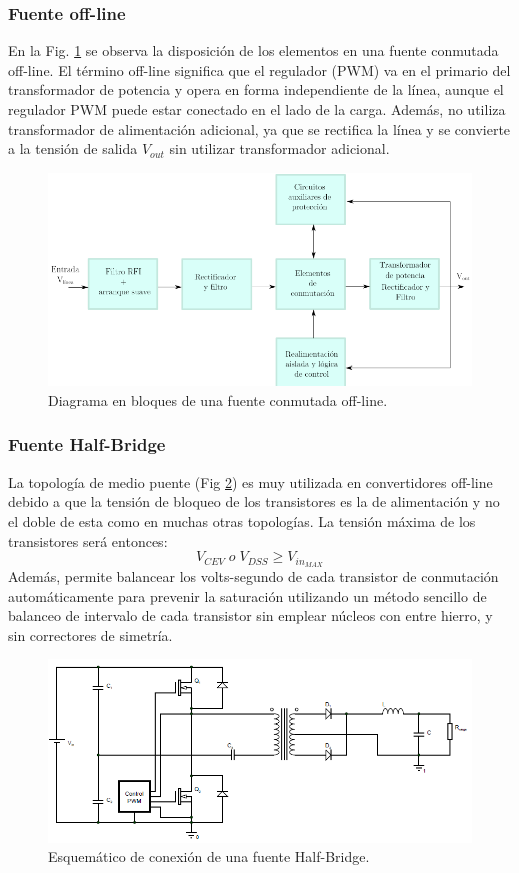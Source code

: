 \documentclass[11pt, a4paper]{article}
\begin{document}
\subsubsection{Fuente off-line}
En la Fig. \ref{esquema} se observa la disposición de los elementos en una fuente conmutada off-line. El término off-line significa que el regulador (PWM) va en el primario del transformador de potencia y opera en forma independiente de la línea, aunque el regulador PWM puede estar conectado en el lado de la carga. Además, no utiliza transformador de alimentación adicional, ya que se rectifica la línea y se convierte a la tensión de salida $V_{out}$ sin utilizar transformador adicional.
\begin{figure}[h]
	\centering
	\includegraphics[width = 12 cm]{Imagenes/esquema}
	\caption{Diagrama en bloques de una fuente conmutada off-line.}
	\label{esquema}
\end{figure}

\subsubsection{Fuente Half-Bridge}
La topología de medio puente (Fig \ref{halfbridge}) es muy utilizada en convertidores off-line debido a que la tensión de bloqueo de los transistores es la de alimentación y no el doble de esta como en muchas otras topologías. La tensión máxima de los transistores será entonces:
\[V_{CEV} \; o \; V_{DSS} \geq V_{in_{MAX}} \]
Además, permite balancear los volts-segundo de cada transistor de conmutación automáticamente para prevenir la saturación utilizando un método sencillo de balanceo de intervalo de cada transistor sin emplear núcleos con entre hierro, y sin correctores de simetría.

\begin{figure}[h]
	\centering
	\includegraphics[width = 12 cm]{Imagenes/halfbridge}
	\caption{Esquemático de conexión de una fuente Half-Bridge.}
	\label{halfbridge}
\end{figure}
\end{document}
